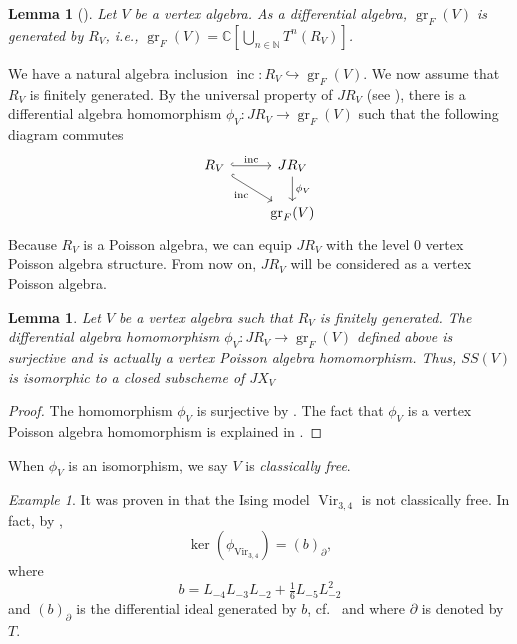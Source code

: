 \documentclass[a4paper, 12pt, reqno]{amsart}
\newtheorem{lemma}[theorem]{Lemma}
\theoremstyle{remark}
\newtheorem{example}[theorem]{Example}
\DeclareMathOperator{\Vir}{Vir}
\DeclareMathOperator{\gr}{gr}
\DeclareMathOperator{\inc}{inc}
\begin{document}
\begin{lemma}[{\cite[Lemma 4.2]{li_abelianizing_2005}}]
  \label{lmm:25}
  Let $V$ be a vertex algebra.
  As a differential algebra, $\gr_F(V)$ is generated by $R_V$, i.e., $\gr_F(V) = \mathbb{C}\left[\bigcup_{n \in \mathbb{N}}T^n(R_V)\right]$.
\end{lemma}

We have a natural algebra inclusion $\inc: R_V \hookrightarrow \gr_F(V)$.
We now assume that $R_V$ is finitely generated.
By the universal property of $JR_V$ (see ), there is a differential algebra homomorphism $\phi_V: JR_V \to \gr_F(V)$ such that the following diagram commutes
\begin{equation*}
  \begin{tikzcd}
    R_V \arrow[rd, "\inc"', hook] \arrow[r, "\inc", hook] & JR_V \arrow[d, "\phi_V"] \\
    & \gr_F(V)
  \end{tikzcd}
\end{equation*}
Because $R_V$ is a Poisson algebra, we can equip $JR_V$ with the level 0 vertex Poisson algebra structure.
From now on, $JR_V$ will be considered as a vertex Poisson algebra.

\begin{lemma}
  \label{lmm:26}
  Let $V$ be a vertex algebra such that $R_V$ is finitely generated.
  The differential algebra homomorphism $\phi_V: JR_V \to \gr_F(V)$ defined above is surjective and is actually a vertex Poisson algebra homomorphism.
  Thus, $SS(V)$ is isomorphic to a closed subscheme of $JX_V$
\end{lemma}

\begin{proof}
  The homomorphism $\phi_V$ is surjective by .
  The fact that $\phi_V$ is a vertex Poisson algebra homomorphism is explained in \cite[Proposition 2.5.1]{arakawa_remark_2012}.
\end{proof}

When $\phi_V$ is an isomorphism, we say $V$ is \emph{classically free}.

\begin{example}
  \label{exa:17}
  It was proven in \cite{andrews_singular_2022} that the Ising model $\Vir_{3, 4}$ is not classically free.
  In fact, by \cite[Theorem 2]{andrews_singular_2022},
  \begin{equation*}
    \ker(\phi_{\Vir_{3, 4}}) = (b)_{\partial},
  \end{equation*}
  where
  \begin{equation*}
    b = L_{-4}L_{-3}L_{-2} + \tfrac{1}{6}L_{-5}L_{-2}^2
  \end{equation*}
  and $(b)_{\partial}$ is the differential ideal generated by $b$, cf.\  and  where $\partial$ is denoted by $T$.
\end{example}
\end{document}
